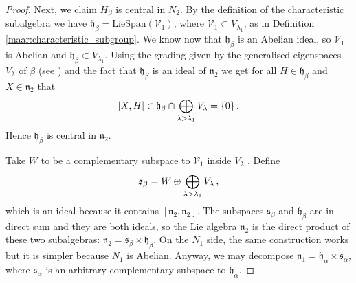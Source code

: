 \documentclass[a4paper,12pt]{amsart}
\newcommand{\pp}{\mathrm}
\theoremstyle{plain}
\theoremstyle{definition}
\theoremstyle{plain}
\theoremstyle{remark}
\begin{document}
\begin{proof}
	
	Next, we claim \( H_\beta \) is central in \( N_2\).
	By the definition of the characteristic subalgebra
	we have \( \mathfrak{h}_\beta = \pp{LieSpan}(\mathcal{V}_1) \), where \( \mathcal{V}_1 \subset V_{\lambda_1} \), as in Definition \ref{maar:characteristic_subgroup}. We know now that \( \mathfrak{h}_\beta \) is an Abelian ideal, so \( \mathcal{V}_1 \) is Abelian and \( \mathfrak{h}_\beta \subset V_{\lambda_1} \). Using the grading given by the generalised eigenspaces \( V_\lambda \) of \( \beta \)  (see \cite[p. 16 Prop. 12]{bourbaki-lie-7-9-fr}) and the fact that \( \mathfrak{h}_\beta \) is an ideal of \( \mathfrak{n}_2 \)  we get for all \( H \in \mathfrak{h}_\beta \) and \( X \in \mathfrak{n}_2 \) that
	\[ [X,H] \in \mathfrak{h}_\beta \cap \bigoplus_{\lambda > \lambda_1} V_\lambda = \{0\} \,. \]
	Hence \( \mathfrak{h}_\beta \) is central in \( \mathfrak{n}_2 \).
	
	Take \( W \) to be a complementary subspace to \( \mathcal{V}_1 \) inside \( V_{\lambda_1} \). 
	Define
	\[ \mathfrak{s}_{\beta} = W \oplus \bigoplus_{\lambda > \lambda_1} V_\lambda \,, \]
	which is an ideal because it contains \( [\mathfrak{n}_2,\mathfrak{n}_2] \). The subspaces \( \mathfrak{s}_{\beta} \) and \( \mathfrak{h}_{\beta} \) are in direct sum and they are both ideals, so the Lie algebra \( \mathfrak{n}_2 \) is the direct product of these two subalgebras: \( \mathfrak{n}_2 = \mathfrak{s}_{\beta} \times  \mathfrak{h}_{\beta} \). On the \( N_1 \) side, the same construction works but it is simpler because \( N_1 \) is Abelian. Anyway, we may decompose \( \mathfrak{n}_1 = \mathfrak{h}_\alpha \times \mathfrak{s}_\alpha \), where \( \mathfrak{s}_\alpha \) is an arbitrary
	complementary subspace to \( \mathfrak{h}_\alpha \).
	

\end{proof}
\end{document}
